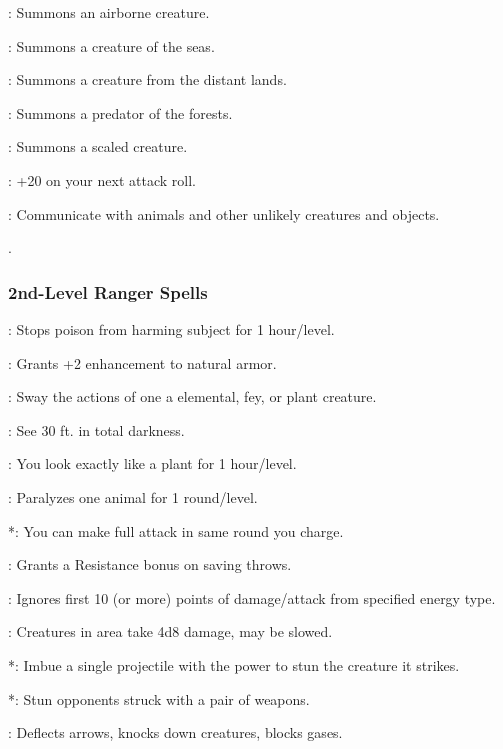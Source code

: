 \begin{list}{}{\leftmargin=1em}
\item {}: Summons an airborne creature.
\item {}: Summons a creature of the seas.
\item {}: Summons a creature from the distant lands.
\item {}: Summons a predator of the forests.
\item {}: Summons a scaled creature.
\item {}: +20 on your next attack roll.
\item {}: Communicate with animals and other unlikely creatures and objects.
\end{list}.
\subsubsection{2nd-Level Ranger Spells}
\begin{list}{}{\leftmargin=1em}
\item {}: Stops poison from harming subject for 1 hour/level.
\item {}: Grants +2 enhancement to natural armor.
\item {}: Sway the actions of one a elemental, fey, or plant creature.
\item {}: See 30 ft. in total darkness.
\item {}: You look exactly like a plant for 1 hour/level.
\item {}: Paralyzes one animal for 1 round/level.
\item {}*: You can make full attack in same round you charge.
\item {}: Grants a Resistance bonus on saving throws.
\item {}: Ignores first 10 (or more) points of damage/attack from specified energy type.
\item {}: Creatures in area take 4d8 damage, may be slowed.
\item {}*: Imbue a single projectile with the power to stun the creature it strikes.
\item {}*: Stun opponents struck with a pair of weapons.
\item {}: Deflects arrows, knocks down creatures, blocks gases.
\end{list}
